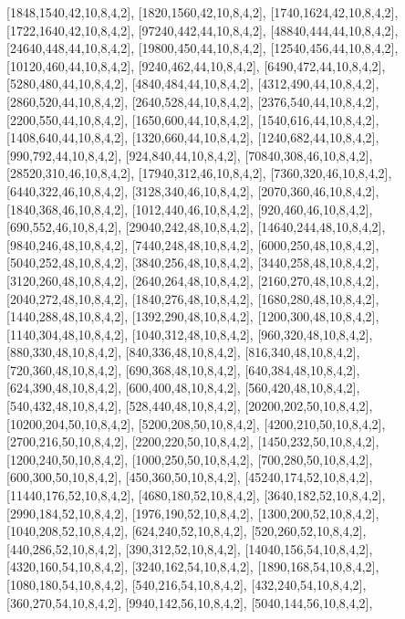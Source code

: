 \documentclass[12pt]{amsart}
\begin{document}
[1848,1540,42,10,8,4,2],   [1820,1560,42,10,8,4,2],   [1740,1624,42,10,8,4,2],   [1722,1640,42,10,8,4,2],   [97240,442,44,10,8,4,2],   [48840,444,44,10,8,4,2],
[24640,448,44,10,8,4,2],   [19800,450,44,10,8,4,2],   [12540,456,44,10,8,4,2],   [10120,460,44,10,8,4,2],   [9240,462,44,10,8,4,2],   [6490,472,44,10,8,4,2],
[5280,480,44,10,8,4,2],   [4840,484,44,10,8,4,2],   [4312,490,44,10,8,4,2],   [2860,520,44,10,8,4,2],   [2640,528,44,10,8,4,2],   [2376,540,44,10,8,4,2],
[2200,550,44,10,8,4,2],   [1650,600,44,10,8,4,2],   [1540,616,44,10,8,4,2],   [1408,640,44,10,8,4,2],   [1320,660,44,10,8,4,2],   [1240,682,44,10,8,4,2],
[990,792,44,10,8,4,2],   [924,840,44,10,8,4,2],   [70840,308,46,10,8,4,2],   [28520,310,46,10,8,4,2],   [17940,312,46,10,8,4,2],   [7360,320,46,10,8,4,2],
[6440,322,46,10,8,4,2],   [3128,340,46,10,8,4,2],   [2070,360,46,10,8,4,2],   [1840,368,46,10,8,4,2],   [1012,440,46,10,8,4,2],   [920,460,46,10,8,4,2],
[690,552,46,10,8,4,2],   [29040,242,48,10,8,4,2],   [14640,244,48,10,8,4,2],   [9840,246,48,10,8,4,2],   [7440,248,48,10,8,4,2],   [6000,250,48,10,8,4,2],
[5040,252,48,10,8,4,2],   [3840,256,48,10,8,4,2],   [3440,258,48,10,8,4,2],   [3120,260,48,10,8,4,2],   [2640,264,48,10,8,4,2],   [2160,270,48,10,8,4,2],
[2040,272,48,10,8,4,2],   [1840,276,48,10,8,4,2],   [1680,280,48,10,8,4,2],   [1440,288,48,10,8,4,2],   [1392,290,48,10,8,4,2],   [1200,300,48,10,8,4,2],
[1140,304,48,10,8,4,2],   [1040,312,48,10,8,4,2],   [960,320,48,10,8,4,2],   [880,330,48,10,8,4,2],   [840,336,48,10,8,4,2],   [816,340,48,10,8,4,2],
[720,360,48,10,8,4,2],   [690,368,48,10,8,4,2],   [640,384,48,10,8,4,2],   [624,390,48,10,8,4,2],   [600,400,48,10,8,4,2],   [560,420,48,10,8,4,2],
[540,432,48,10,8,4,2],   [528,440,48,10,8,4,2],   [20200,202,50,10,8,4,2],   [10200,204,50,10,8,4,2],   [5200,208,50,10,8,4,2],   [4200,210,50,10,8,4,2],
[2700,216,50,10,8,4,2],   [2200,220,50,10,8,4,2],   [1450,232,50,10,8,4,2],   [1200,240,50,10,8,4,2],   [1000,250,50,10,8,4,2],   [700,280,50,10,8,4,2],
[600,300,50,10,8,4,2],   [450,360,50,10,8,4,2],   [45240,174,52,10,8,4,2],   [11440,176,52,10,8,4,2],   [4680,180,52,10,8,4,2],   [3640,182,52,10,8,4,2],
[2990,184,52,10,8,4,2],   [1976,190,52,10,8,4,2],   [1300,200,52,10,8,4,2],   [1040,208,52,10,8,4,2],   [624,240,52,10,8,4,2],   [520,260,52,10,8,4,2],
[440,286,52,10,8,4,2],   [390,312,52,10,8,4,2],   [14040,156,54,10,8,4,2],   [4320,160,54,10,8,4,2],   [3240,162,54,10,8,4,2],   [1890,168,54,10,8,4,2],
[1080,180,54,10,8,4,2],   [540,216,54,10,8,4,2],   [432,240,54,10,8,4,2],   [360,270,54,10,8,4,2],   [9940,142,56,10,8,4,2],   [5040,144,56,10,8,4,2],
\end{document}

